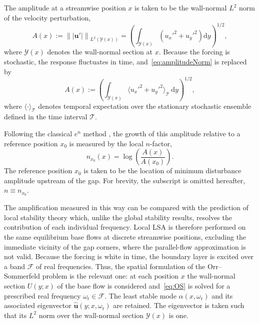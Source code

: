 \documentclass[lineno]{jfm}
\begin{document}
The amplitude at a streamwise position $x$ is taken to be the wall-normal $L^2$ norm of the velocity perturbation,
\begin{equation}
	A(x) := {\||\boldsymbol{u}'|\|}_{L^2(\mathcal{Y}(x))} = {\left( \int_{\mathcal{Y}(x)} ({u_x'}^2 + {u_y'}^2) \mathrm{d}y\right)}^{1/2},
	\label{eq:amplitudeNorm}
\end{equation}
where $\mathcal{Y}(x)$ denotes the wall-normal section at $x$. Because the forcing is stochastic, the response fluctuates in time, and~\eqref{eq:amplitudeNorm} is replaced by
\begin{equation}
	A(x) := {\left( \int_{\mathcal{Y}(x)} {\langle {u_x'}^2 + {u_y'}^2\rangle}_\mathcal{T}\, \mathrm{d}y\right)}^{1/2},
	\label{eq:amplitudeTimeAverage}
\end{equation}
where ${\langle \cdot \rangle}_\mathcal{T}$ denotes temporal expectation over the stationary stochastic ensemble defined in the time interval $\mathcal{T}$.

Following the classical $e^n$ method \citep{smithgamberoni,vanIngen1956}, the growth of this amplitude relative to a reference position $x_0$ is measured by the local $n$-factor,
\begin{equation}
	n_{x_0}(x) = \log\left(\frac{A(x)}{A(x_0)} \right).
\end{equation}
The reference position $x_0$ is taken to be the location of minimum disturbance amplitude upstream of the gap. For brevity, the subscript is omitted hereafter, $n\equiv n_{x_0}$.

The amplification measured in this way can be compared with the prediction of local stability theory which, unlike the global stability results, resolves the contribution of each individual frequency. Local \ac{LSA} is therefore performed on the same equilibrium base flows at discrete streamwise positions, excluding the immediate vicinity of the gap corners, where the parallel-flow approximation is not valid. Because the forcing is white in time, the boundary layer is excited over a band $\mathcal{F}$ of real frequencies. Thus, the spatial formulation of the Orr--Sommerfeld problem is the relevant one: at each position $x$ the wall-normal section $U(y;x)$ of the base flow is considered and~\eqref{eq:OS} is solved for a prescribed real frequency $\omega_\mathrm{r}\in\mathcal{F}$. The least stable mode $\alpha(x,\omega_\mathrm{r})$ and its associated eigenvector $\hat{\boldsymbol{u}}(y;x,\omega_\mathrm{r})$ are retained. The eigenvector is taken such that its $L^2$ norm over the wall-normal section $\mathcal{Y}(x)$ is one. %
\end{document}
